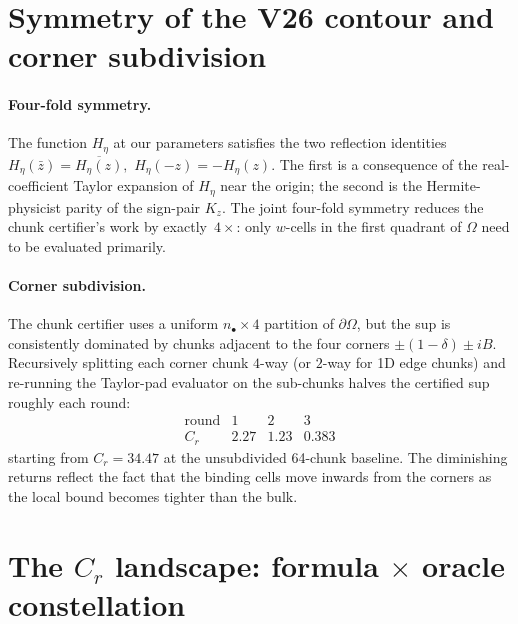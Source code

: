 \documentclass[11pt]{article}
\theoremstyle{definition}
\newcommand{\Heta}{H_{\eta}}
\newcommand{\Om}{\Omega}
\newcommand{\dOm}{\partial\Omega}
\begin{document}
\bigskip

\section{Symmetry of the V26 contour and corner subdivision}\label{sec:subdivision}

\paragraph{Four-fold symmetry.}
The function $\Heta$ at our parameters satisfies the two reflection identities
\(
   \Heta(\bar z) = \overline{\Heta(z)},
\)
\(
   \Heta(-z) = -\Heta(z).
\)
The first is a consequence of the real-coefficient Taylor expansion of $\Heta$ near
the origin; the second is the Hermite-physicist parity of the sign-pair $K_z$. The
joint four-fold symmetry reduces the chunk certifier's work by exactly~$4\times$:
only $w$-cells in the first quadrant of $\Om$ need to be evaluated primarily.

\paragraph{Corner subdivision.}
The chunk certifier uses a uniform $n_\bullet \times 4$ partition of $\dOm$, but the
sup is consistently dominated by chunks adjacent to the four corners
$\pm(1-\delta) \pm iB$. Recursively splitting each corner chunk $4$-way (or $2$-way for
1D edge chunks) and re-running the Taylor-pad evaluator on the sub-chunks halves
the certified sup roughly each round:
\[
\begin{array}{c|ccc}
   \text{round} & 1 & 2 & 3 \\\hline
   C_r & 2.27 & 1.23 & 0.383
\end{array}
\]
starting from $C_r=34.47$ at the unsubdivided 64-chunk baseline. The diminishing returns
reflect the fact that the binding cells move inwards from the corners as the local
bound becomes tighter than the bulk.

\bigskip

\section{The $C_r$ landscape: formula $\times$ oracle constellation}\label{sec:landscape}
\end{document}
